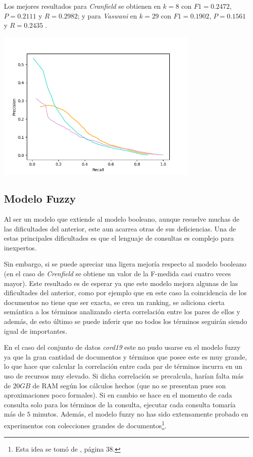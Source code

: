 \documentclass{llncs}
\begin{document}
    Los mejores resultados para \emph{Cranfield} se obtienen en $k = 8$ con $F1 = 0.2472$, $P = 0.2111$ y $R = 0.2982$; y para \emph{Vaswani} en $k = 29$ con $F1 = 0.1902$, $P = 0.1561$ y $R = 0.2435$ .

    \begin{center}
        \includegraphics[width=10cm]{PR_plot(all).png}    
    \end{center}

	\subsection{Modelo Fuzzy}
	
	Al ser un modelo que extiende al modelo booleano, aunque resuelve muchas de las dificultades del anterior, este aun acarrea otras de sus deficiencias. Una de estas principales dificultades es que el lenguaje de consultas es complejo para inexpertos.
	
	Sin embargo, si se puede apreciar una ligera mejor\'ia respecto al modelo booleano (en el caso de \emph{Crenfield} se obtiene un valor de la F-medida casi cuatro veces mayor). Este resultado es de esperar ya que este modelo mejora algunas de las dificultades del anterior, como por ejemplo que en este caso la coincidencia de los documentos no tiene que ser exacta, se crea un ranking, se adiciona cierta sem\'antica a los t\'erminos analizando cierta correlaci\'on entre los pares de ellos y adem\'as, de esto \'ultimo se puede inferir que no todos los t\'erminos seguir\'an siendo igual de importantes.
	 
	En el caso del conjunto de datos \emph{cord19} este no pudo usarse en el modelo fuzzy ya que la gran cantidad de documentos y t\'erminos que posee este es muy grande, lo que hace que calcular la correlaci\'on entre cada par de t\'erminos incurra en un uso de recursos muy elevado. Si dicha correlaci\'on se precalcula, har\'ian falta m\'as de $20 GB$ de RAM seg\'un los c\'alculos hechos (que no se presentan pues son aproximaciones poco formales). Si en cambio se hace en el momento de cada consulta solo para los t\'erminos de la consulta, ejecutar cada consulta tomar\'ia m\'as de $5$ minutos. Adem\'as, el modelo fuzzy no has sido extensamente probado en experimentos con colecciones grandes de documentos\footnote{Esta idea se tom\'o de \cite{B2}, p\'agina $38$.}.
	
\end{document}
